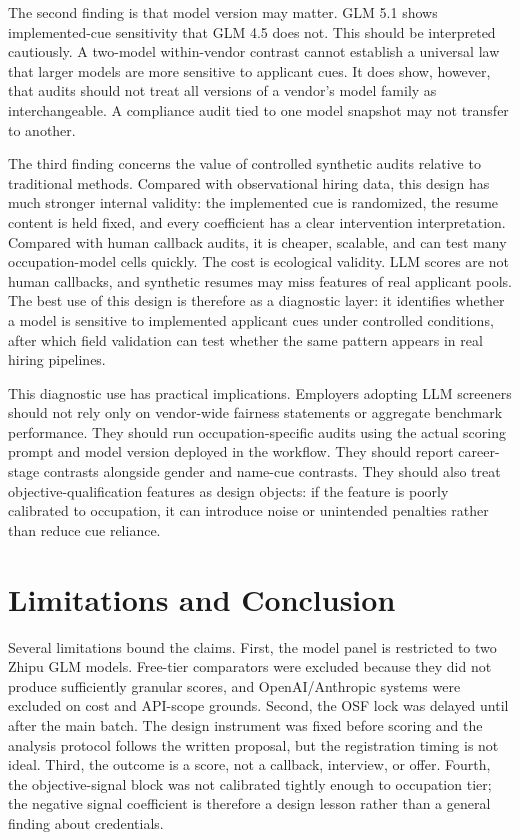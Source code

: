 \documentclass[10pt,twocolumn,letterpaper]{article}
\begin{document}
The second finding is that model version may matter. GLM 5.1 shows implemented-cue sensitivity that GLM 4.5 does not. This should be interpreted cautiously. A two-model within-vendor contrast cannot establish a universal law that larger models are more sensitive to applicant cues. It does show, however, that audits should not treat all versions of a vendor's model family as interchangeable. A compliance audit tied to one model snapshot may not transfer to another.

The third finding concerns the value of controlled synthetic audits relative to traditional methods. Compared with observational hiring data, this design has much stronger internal validity: the implemented cue is randomized, the resume content is held fixed, and every coefficient has a clear intervention interpretation. Compared with human callback audits, it is cheaper, scalable, and can test many occupation-model cells quickly. The cost is ecological validity. LLM scores are not human callbacks, and synthetic resumes may miss features of real applicant pools. The best use of this design is therefore as a diagnostic layer: it identifies whether a model is sensitive to implemented applicant cues under controlled conditions, after which field validation can test whether the same pattern appears in real hiring pipelines.

This diagnostic use has practical implications. Employers adopting LLM screeners should not rely only on vendor-wide fairness statements or aggregate benchmark performance. They should run occupation-specific audits using the actual scoring prompt and model version deployed in the workflow. They should report career-stage contrasts alongside gender and name-cue contrasts. They should also treat objective-qualification features as design objects: if the feature is poorly calibrated to occupation, it can introduce noise or unintended penalties rather than reduce cue reliance.

\section{Limitations and Conclusion}

Several limitations bound the claims. First, the model panel is restricted to two Zhipu GLM models. Free-tier comparators were excluded because they did not produce sufficiently granular scores, and OpenAI/Anthropic systems were excluded on cost and API-scope grounds. Second, the OSF lock was delayed until after the main batch. The design instrument was fixed before scoring and the analysis protocol follows the written proposal, but the registration timing is not ideal. Third, the outcome is a score, not a callback, interview, or offer. Fourth, the objective-signal block was not calibrated tightly enough to occupation tier; the negative signal coefficient is therefore a design lesson rather than a general finding about credentials.
\end{document}
